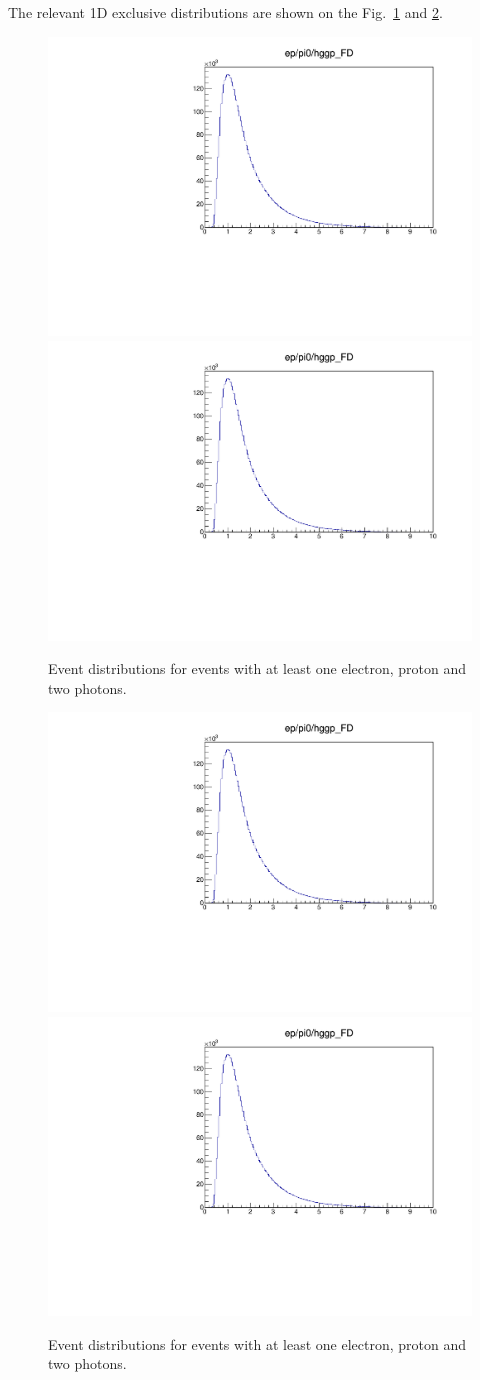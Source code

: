     The relevant 1D exclusive distributions are shown on the Fig.~\ref{fig:rawexclusive1} and \ref{fig:rawexclusive2}.
    
    \begin{figure}[hbt]
    	\centering
    	\includegraphics[page=4,width=0.47\linewidth]{Chapters/Ch4-BaseAnalysis/1_Event_Selection_Cuts/figures/eppi0.exclusive.pdf}
    	\includegraphics[page=5,width=0.47\linewidth]{Chapters/Ch4-BaseAnalysis/1_Event_Selection_Cuts/figures/eppi0.exclusive.pdf}
    	\caption[Missing Mass Spectra]{Event distributions for events with at least one electron, proton and two photons.}
    	\label{fig:rawexclusive1}
    \end{figure}
    
    \begin{figure}[hbt]
    	\centering
    	\includegraphics[page=6,width=0.47\linewidth]{Chapters/Ch4-BaseAnalysis/1_Event_Selection_Cuts/figures/eppi0.exclusive.pdf}
    	\includegraphics[page=8,width=0.47\linewidth]{Chapters/Ch4-BaseAnalysis/1_Event_Selection_Cuts/figures/eppi0.exclusive.pdf}
    	\caption[Invariant $\gamma \gamma$ Distribution]{Event distributions for events with at least one electron, proton and two photons.}
    	\label{fig:rawexclusive2}
    \end{figure}
    
